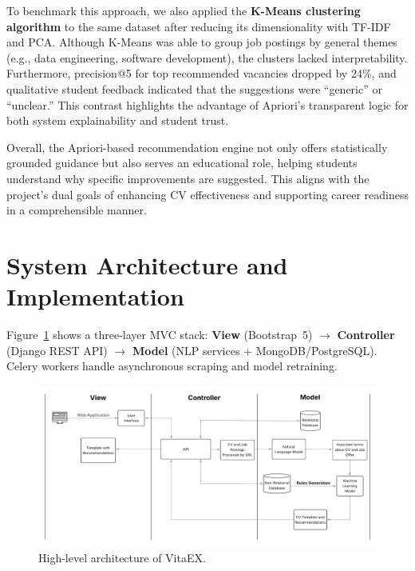 \documentclass[runningheads]{llncs}
\begin{document}
	To benchmark this approach, we also applied the \textbf{K-Means clustering algorithm} to the same dataset after reducing its dimensionality with TF-IDF and PCA. Although K-Means was able to group job postings by general themes (e.g., data engineering, software development), the clusters lacked interpretability. Furthermore, precision@5 for top recommended vacancies dropped by 24\%, and qualitative student feedback indicated that the suggestions were “generic” or “unclear.” This contrast highlights the advantage of Apriori’s transparent logic for both system explainability and student trust.
	
	Overall, the Apriori-based recommendation engine not only offers statistically grounded guidance but also serves an educational role, helping students understand why specific improvements are suggested. This aligns with the project’s dual goals of enhancing CV effectiveness and supporting career readiness in a comprehensible manner.
	
	
	\newpage

	\section{System Architecture and Implementation}
	
	Figure~\ref{fig:blocks} shows a three-layer MVC stack: \textbf{View} (Bootstrap~5) $\rightarrow$ \textbf{Controller} (Django REST API) $\rightarrow$ \textbf{Model} (NLP services + MongoDB/PostgreSQL). Celery workers handle asynchronous scraping and model retraining.
	
	\begin{figure}[H]
		\centering
		\includegraphics[width=1\linewidth]{imagenes/Arquitectura_Sistema.png}
		\caption{High-level architecture of VitaEX.}
		\label{fig:blocks}
	\end{figure}
	
\end{document}
